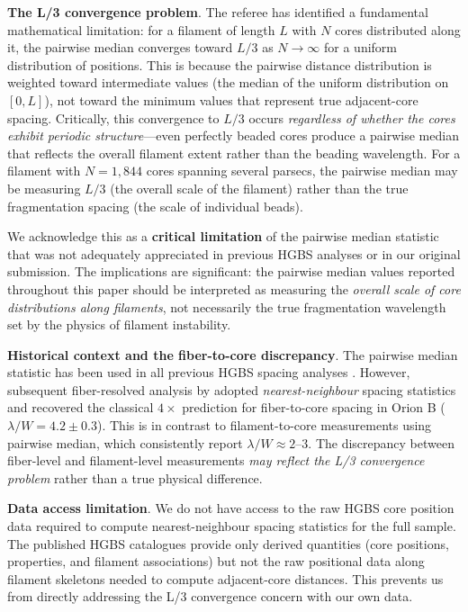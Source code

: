 \documentclass[twoside,twocolumn]{mnras}
\begin{document}
\textbf{The L/3 convergence problem}. The referee has identified a fundamental mathematical limitation: for a filament of length $L$ with $N$ cores distributed along it, the pairwise median converges toward $L/3$ as $N \to \infty$ for a uniform distribution of positions. This is because the pairwise distance distribution is weighted toward intermediate values (the median of the uniform distribution on $[0, L]$), not toward the minimum values that represent true adjacent-core spacing. Critically, this convergence to $L/3$ occurs \textit{regardless of whether the cores exhibit periodic structure}—even perfectly beaded cores produce a pairwise median that reflects the overall filament extent rather than the beading wavelength. For a filament with $N = 1,844$ cores spanning several parsecs, the pairwise median may be measuring $L/3$ (the overall scale of the filament) rather than the true fragmentation spacing (the scale of individual beads).

We acknowledge this as a \textbf{critical limitation} of the pairwise median statistic that was not adequately appreciated in previous HGBS analyses or in our original submission. The implications are significant: the pairwise median values reported throughout this paper should be interpreted as measuring the \textit{overall scale of core distributions along filaments}, not necessarily the true fragmentation wavelength set by the physics of filament instability.

\textbf{Historical context and the fiber-to-core discrepancy}. The pairwise median statistic has been used in all previous HGBS spacing analyses \citep{Arzoumanian2011, Arzoumanian2019}. However, subsequent fiber-resolved analysis by \citet{Hacar2013, Hacar2018} adopted \textit{nearest-neighbour} spacing statistics and recovered the classical $4\times$ prediction for fiber-to-core spacing in Orion B ($\lambda/W = 4.2 \pm 0.3$). This is in contrast to filament-to-core measurements using pairwise median, which consistently report $\lambda/W \approx 2$--$3$. The discrepancy between fiber-level and filament-level measurements \textit{may reflect the L/3 convergence problem} rather than a true physical difference.

\textbf{Data access limitation}. We do not have access to the raw HGBS core position data required to compute nearest-neighbour spacing statistics for the full sample. The published HGBS catalogues provide only derived quantities (core positions, properties, and filament associations) but not the raw positional data along filament skeletons needed to compute adjacent-core distances. This prevents us from directly addressing the L/3 convergence concern with our own data.
\end{document}
